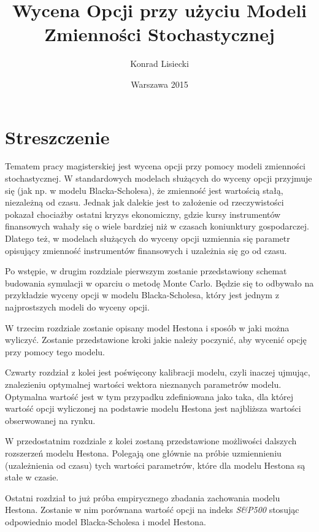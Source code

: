\documentclass{pracamgr}
\author{Konrad Lisiecki}
\title{Wycena Opcji przy użyciu Modeli Zmienności Stochastycznej}
\date{Warszawa 2015}
\begin{document}
\maketitle
\nocite{book-full} 

\chapter*{Streszczenie} 


Tematem pracy magisterskiej jest wycena opcji przy pomocy modeli zmienności stochastycznej. 
W standardowych modelach służących do wyceny opcji przyjmuje się (jak np. w modelu 
Blacka-Scholesa), że zmienność jest wartością stałą, niezależną od czasu. 
Jednak jak dalekie jest to założenie od rzeczywistości pokazał chociażby ostatni kryzys 
ekonomiczny, gdzie kursy instrumentów finansowych wahały się o wiele bardziej niż w czasach
koniunktury gospodarczej. Dlatego też, w modelach służących do wyceny opcji uzmiennia się parametr opisujący zmienność instrumentów finansowych i uzależnia się go od czasu. 


Po wstępie, w drugim rozdziale pierwszym zostanie przedstawiony schemat budowania symulacji w oparciu o metodę Monte Carlo. Będzie się to odbywało na przykładzie wyceny opcji w modelu Blacka-Scholesa, który 
jest jednym z najprostszych modeli do wyceny opcji.

W trzecim rozdziale zostanie opisany model Hestona i sposób w jaki można wyliczyć. 
Zostanie przedstawione kroki jakie należy poczynić, aby wycenić opcję przy pomocy tego modelu.

Czwarty rozdział z kolei jest poświęcony kalibracji modelu, czyli inaczej ujmując, znalezieniu 
optymalnej wartości wektora nieznanych parametrów modelu. Optymalna wartość jest w tym przypadku zdefiniowana
jako taka, dla której wartość opcji wyliczonej na podstawie modelu Hestona jest najbliższa wartości 
obserwowanej na rynku.

W przedostatnim rozdziale z kolei zostaną przedstawione możliwości dalszych rozszerzeń modelu Hestona. 
Polegają one głównie na próbie uzmiennieniu (uzależnienia od czasu) tych wartości parametrów, które dla 
modelu Hestona są stałe w czasie.

Ostatni rozdział to już próba empirycznego zbadania zachowania modelu Hestona. Zostanie w nim porównana
wartość opcji na indeks \textit{S\&P500} stosując odpowiednio model Blacka-Scholesa i model Hestona.
\end{document}
